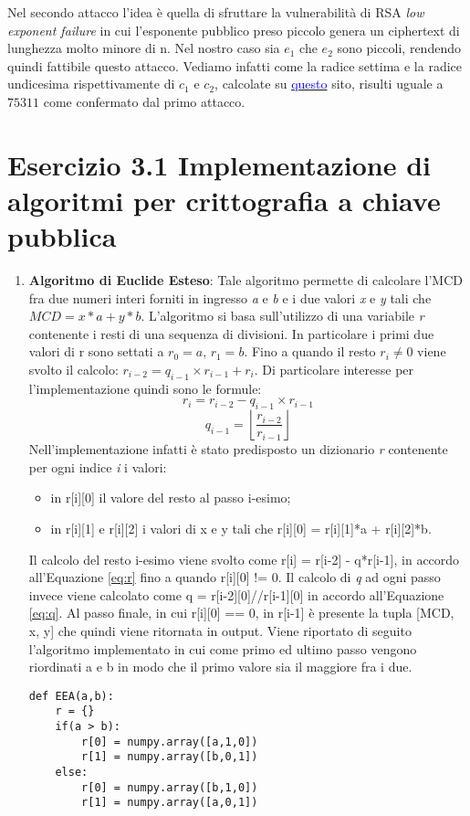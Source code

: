 \documentclass{article}
\begin{document}
Nel secondo attacco l'idea è quella di sfruttare la vulnerabilità di RSA \textit{low exponent failure} in cui l'esponente pubblico preso piccolo genera un ciphertext di lunghezza molto minore di n. Nel nostro caso sia $e_1$ che $e_2$ sono piccoli, rendendo quindi fattibile questo attacco. Vediamo infatti come la radice settima e la radice undicesima rispettivamente di $c_1$ e $c_2$, calcolate su \href{https://it.calcprofi.com/calcolatrice-radice-ennesima.html}{\textcolor{blue}{questo}} sito,  risulti uguale a $75311$ come confermato dal primo attacco.

\section*{Esercizio 3.1 Implementazione di algoritmi per crittografia a chiave pubblica}
\begin{enumerate}
    \item \textbf{Algoritmo di Euclide Esteso}: Tale algoritmo permette di calcolare l'MCD fra due numeri interi forniti in ingresso \textit{a} e \textit{b} e i due valori \textit{x} e \textit{y} tali che $MCD = x*a + y*b$. L'algoritmo si basa sull'utilizzo di una variabile \textit{r} contenente i resti di una sequenza di divisioni. In particolare i primi due valori di r sono settati a $r_0 = a$, $r_1 = b$. Fino a quando il resto $r_i \neq 0$ viene svolto il calcolo: $r_{i-2} = q_{i-1} \times r_{i-1} + r_i$. Di particolare interesse per l'implementazione quindi sono le formule:
    \begin{equation}
        r_i = r_{i-2} - q_{i-1} \times r_{i-1}
        \label{eq:r}
    \end{equation}
    \begin{equation}
        q_{i-1} = \left\lfloor \frac{r_{i-2}}{r_{i-1}} \right\rfloor
        \label{eq:q}
    \end{equation}
    Nell'implementazione infatti è stato predisposto un dizionario \textit{r} contenente per ogni indice \textit{i} i valori: 
    \begin{itemize}
        \item in r[i][0] il valore del resto al passo i-esimo;
        \item in r[i][1] e r[i][2] i valori di x e y tali che r[i][0] = r[i][1]*a + r[i][2]*b.
    \end{itemize}
    Il calcolo del resto i-esimo viene svolto come r[i] = r[i-2] - q*r[i-1], in accordo all'Equazione \ref{eq:r} fino a quando r[i][0] != 0. Il calcolo di \textit{q} ad ogni passo invece viene calcolato come q = r[i-2][0]//r[i-1][0] in accordo all'Equazione \ref{eq:q}.
    Al passo finale, in cui r[i][0] == 0, in r[i-1] è presente la tupla [MCD, x, y] che quindi viene ritornata in output. 
    Viene riportato di seguito l'algoritmo implementato in cui come primo ed ultimo passo vengono riordinati a e b in modo che il primo valore sia il maggiore fra i due.
    \begin{lstlisting}
def EEA(a,b):
    r = {}
    if(a > b):
        r[0] = numpy.array([a,1,0])
        r[1] = numpy.array([b,0,1])
    else:
        r[0] = numpy.array([b,1,0])
        r[1] = numpy.array([a,0,1])
    

\end{lstlisting}
\end{enumerate}
\end{document}
